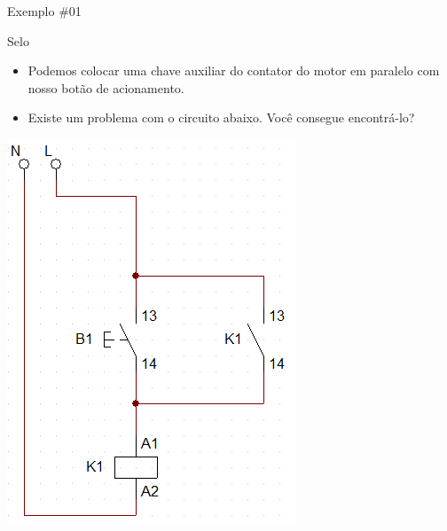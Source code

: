\begin{frame}{Exemplo \#01}
\begin{block}{Selo}
\begin{itemize}
    \item Podemos colocar uma chave auxiliar do contator do motor em paralelo com nosso botão de acionamento.
    \item Existe um problema com o circuito abaixo. Você consegue encontrá-lo?
\end{itemize}
\end{block}

\centerline{\includegraphics[height=0.65\textheight]{Figuras/Ch07/fig2.jpg}}
\end{frame}


